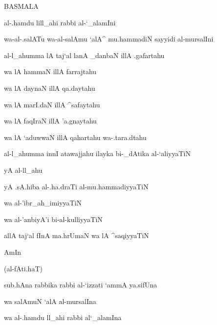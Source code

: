 \documentclass{minimal}
\begin{document}
\begin{arab}[trans]

BASMALA

al-.hamdu lill_ahi rabbi al-`_alamIni

wa-al-.salATu wa-al-salAmu `alA^ mu.hammadiN sayyidi al-mursalIni

al-l_ahumma lA taj`al lanA _danbaN illA .gafartahu

wa lA hammaN illA farrajtahu

wa lA daynaN illA qa.daytahu

wa lA marI.daN illA ^safaytahu

wa lA faqIraN illA 'a.gnaytahu

wa lA `aduwwaN illA qahartahu wa-.tara.dtahu

al-l_ahumma innI atawajjahu ilayka bi-_dAtika al-`aliyyaTiN

yA al-ll_ahu

yA .sA.hiba al-.ha.draTi al-mu.hammadiyyaTiN

wa al-'ibr_ah_imiyyaTiN

wa al-'anbiyA'i bi-al-kulliyyaTiN

allA taj`al fInA ma.hrUmaN wa lA ^saqiyyaTiN

AmIn

(al-fAti.haT)

sub.hAna rabbika rabbi al-`izzati `ammA ya.sifUna

wa salAmuN `alA al-mursalIna

wa al-.hamdu ll_ahi rabbi al`_alamIna
\end{arab}
\end{document}
